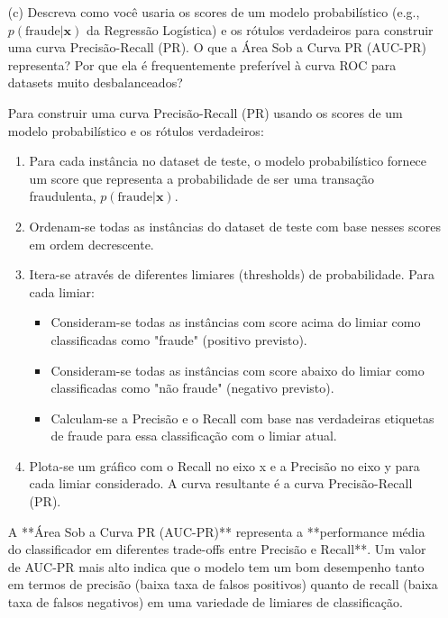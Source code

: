 \documentclass{article}
\begin{document}
\begin{enumerate}
    \item[(c)] Descreva como você usaria os scores de um modelo probabilístico (e.g., $p(\text{fraude}|\mathbf{x})$ da Regressão Logística) e os rótulos verdadeiros para construir uma curva Precisão-Recall (PR). O que a Área Sob a Curva PR (AUC-PR) representa? Por que ela é frequentemente preferível à curva ROC para datasets muito desbalanceados?

    Para construir uma curva Precisão-Recall (PR) usando os scores de um modelo probabilístico e os rótulos verdadeiros:
    \begin{enumerate}
        \item Para cada instância no dataset de teste, o modelo probabilístico fornece um score que representa a probabilidade de ser uma transação fraudulenta, $p(\text{fraude}|\mathbf{x})$.
        \item Ordenam-se todas as instâncias do dataset de teste com base nesses scores em ordem decrescente.
        \item Itera-se através de diferentes limiares (thresholds) de probabilidade. Para cada limiar:
        \begin{itemize}
            \item Consideram-se todas as instâncias com score acima do limiar como classificadas como "fraude" (positivo previsto).
            \item Consideram-se todas as instâncias com score abaixo do limiar como classificadas como "não fraude" (negativo previsto).
            \item Calculam-se a Precisão e o Recall com base nas verdadeiras etiquetas de fraude para essa classificação com o limiar atual.
        \end{itemize}
        \item Plota-se um gráfico com o Recall no eixo x e a Precisão no eixo y para cada limiar considerado. A curva resultante é a curva Precisão-Recall (PR).
    \end{enumerate}

    A **Área Sob a Curva PR (AUC-PR)** representa a **performance média do classificador em diferentes trade-offs entre Precisão e Recall**. Um valor de AUC-PR mais alto indica que o modelo tem um bom desempenho tanto em termos de precisão (baixa taxa de falsos positivos) quanto de recall (baixa taxa de falsos negativos) em uma variedade de limiares de classificação.


\end{enumerate}
\end{document}
